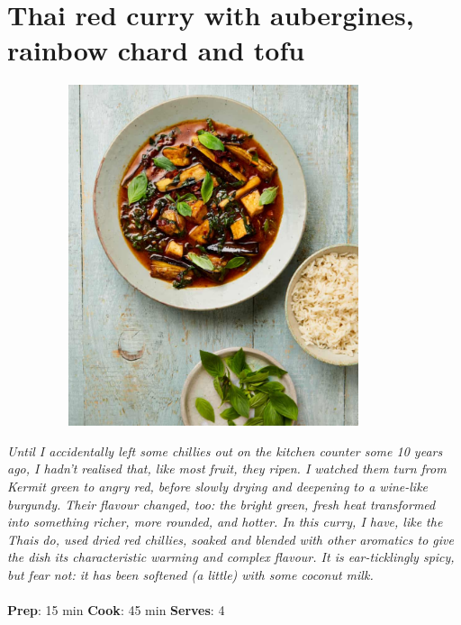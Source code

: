 \documentclass{book}
\begin{document}
\section{Thai red curry with aubergines, rainbow chard and tofu}
\begin{figure}
\centering\includegraphics[width=10cm,height=10cm,keepaspectratio]{Recipe_Pictures/Thai_red_curry_with_aubergines,_rainbow_chard_and_tofu.png}
\end{figure}
\emph{Until I accidentally left some chillies out on the kitchen counter some 10 years ago, I hadn’t realised that, like most fruit, they ripen. I watched them turn from Kermit green to angry red, before slowly drying and deepening to a wine-like burgundy. Their flavour changed, too: the bright green, fresh heat transformed into something richer, more rounded, and hotter. In this curry, I have, like the Thais do, used dried red chillies, soaked and blended with other aromatics to give the dish its characteristic warming and complex flavour. It is ear-ticklingly spicy, but fear not: it has been softened (a little) with some coconut milk.}\\\\ 
\textbf{Prep}: 15 min
\textbf{Cook}: 45 min
\textbf{Serves}: 4
\end{document}
